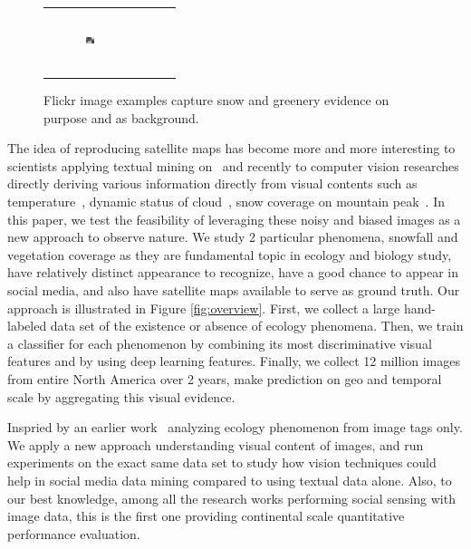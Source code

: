 \begin{figure}[t]
{{\begin{center}
\begin{tabular}{@{}c@{\,\,\,}c@{\,\,\,}c@{\,\,\,}c@{\,\,\,}}
\includegraphics[width=0.1\textwidth, height=0.7in]{image/humantree.jpg} \\
\end{tabular}
\end{center}
}}
\caption{Flickr image examples capture snow and greenery evidence on purpose and as background.}
\label{fig:flickrexp}
\end{figure}


The idea of reproducing satellite maps has become more and more interesting to scientists applying 
textual mining on~\cite{bollen11twitter,ecology2012www,you2015multifacetedelections,wood2013usingtourism} 
and recently to computer vision researches directly deriving various information directly from visual contents such as
 temperature~\cite{glasner2015hot}, dynamic status of cloud~\cite{murdock}, snow coverage on mountain peak~\cite{fedorov2015snowwatch, fedorov2014snow}.
In this paper, we test the feasibility of leveraging these noisy and biased images as a new 
approach to observe nature. We study 2 particular phenomena, snowfall and vegetation 
coverage as they are fundamental topic in ecology and biology study, have relatively 
distinct appearance to recognize, have a good chance to appear in social media, 
and also have satellite maps available to serve as ground truth. Our approach is 
illustrated in Figure \ref{fig:overview}. 
First, we collect a large hand-labeled data set of the existence or absence of ecology phenomena. 
Then, we train a classifier for each phenomenon by combining its most discriminative visual 
features and by using deep learning features. 
Finally, we collect 12 million images from entire North America over 2 years, make prediction 
on geo and temporal scale by aggregating this visual evidence.

Inspried by an earlier work~\cite{ecology2012www} 
analyzing ecology phenomenon from image tags only. We apply a new approach 
understanding visual content of images, and run experiments on the exact same 
data set to study how vision techniques could help in social media data mining 
compared to using textual data alone. Also, to our best knowledge, among all the 
research works performing social sensing with image data, this is the first one 
providing continental scale quantitative performance evaluation.


